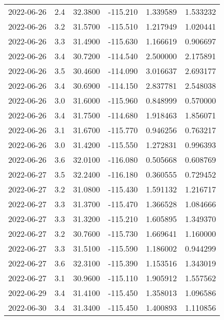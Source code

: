 \begin{tabular}{lrrrrr}
2022-06-26 &       2.4 &  32.3800 &  -115.210 &         1.339589 &         1.533232 \\
2022-06-26 &       3.2 &  31.5700 &  -115.510 &         1.217949 &         1.020441 \\
2022-06-26 &       3.3 &  31.4900 &  -115.630 &         1.166619 &         0.906697 \\
2022-06-26 &       3.4 &  30.7200 &  -114.540 &         2.500000 &         2.175891 \\
2022-06-26 &       3.5 &  30.4600 &  -114.090 &         3.016637 &         2.693177 \\
2022-06-26 &       3.4 &  30.6900 &  -114.150 &         2.837781 &         2.548038 \\
2022-06-26 &       3.0 &  31.6000 &  -115.960 &         0.848999 &         0.570000 \\
2022-06-26 &       3.4 &  31.7500 &  -114.680 &         1.918463 &         1.856071 \\
2022-06-26 &       3.1 &  31.6700 &  -115.770 &         0.946256 &         0.763217 \\
2022-06-26 &       3.0 &  31.4200 &  -115.550 &         1.272831 &         0.996393 \\
2022-06-26 &       3.6 &  32.0100 &  -116.080 &         0.505668 &         0.608769 \\
2022-06-27 &       3.5 &  32.2400 &  -116.180 &         0.360555 &         0.729452 \\
2022-06-27 &       3.2 &  31.0800 &  -115.430 &         1.591132 &         1.216717 \\
2022-06-27 &       3.3 &  31.3700 &  -115.470 &         1.366528 &         1.084666 \\
2022-06-27 &       3.3 &  31.3200 &  -115.210 &         1.605895 &         1.349370 \\
2022-06-27 &       3.2 &  30.7600 &  -115.730 &         1.669641 &         1.160000 \\
2022-06-27 &       3.3 &  31.5100 &  -115.590 &         1.186002 &         0.944299 \\
2022-06-27 &       3.6 &  32.3100 &  -115.390 &         1.153516 &         1.343019 \\
2022-06-27 &       3.1 &  30.9600 &  -115.110 &         1.905912 &         1.557562 \\
2022-06-29 &       3.4 &  31.4100 &  -115.450 &         1.358013 &         1.096586 \\
2022-06-30 &       3.4 &  31.3400 &  -115.450 &         1.400893 &         1.110856 \\

\end{tabular}
